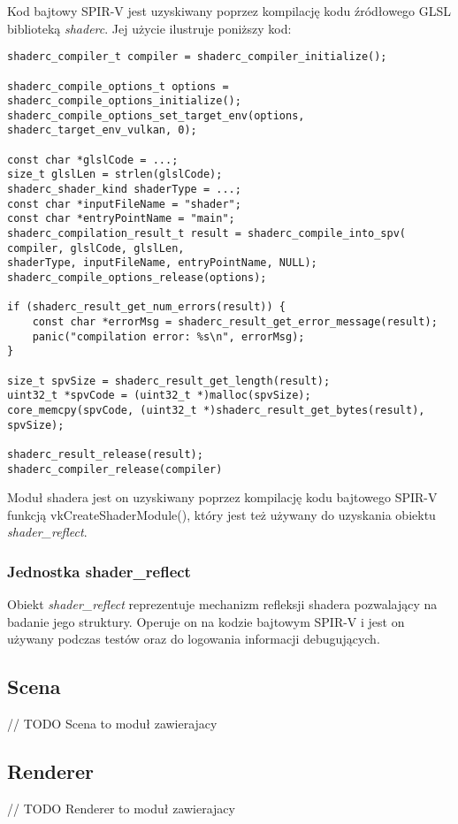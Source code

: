 Kod bajtowy SPIR-V jest uzyskiwany poprzez kompilację kodu źródłowego GLSL biblioteką \textit{shaderc}.
Jej użycie ilustruje poniższy kod:
\lstset{language=C}
\begin{lstlisting}
shaderc_compiler_t compiler = shaderc_compiler_initialize();

shaderc_compile_options_t options = shaderc_compile_options_initialize();
shaderc_compile_options_set_target_env(options, shaderc_target_env_vulkan, 0);

const char *glslCode = ...;
size_t glslLen = strlen(glslCode);
shaderc_shader_kind shaderType = ...;
const char *inputFileName = "shader";
const char *entryPointName = "main";
shaderc_compilation_result_t result = shaderc_compile_into_spv(
compiler, glslCode, glslLen,
shaderType, inputFileName, entryPointName, NULL);
shaderc_compile_options_release(options);

if (shaderc_result_get_num_errors(result)) {
	const char *errorMsg = shaderc_result_get_error_message(result);
	panic("compilation error: %s\n", errorMsg);
}

size_t spvSize = shaderc_result_get_length(result);
uint32_t *spvCode = (uint32_t *)malloc(spvSize);
core_memcpy(spvCode, (uint32_t *)shaderc_result_get_bytes(result), spvSize);

shaderc_result_release(result);
shaderc_compiler_release(compiler)
\end{lstlisting}

Moduł shadera jest on uzyskiwany poprzez kompilację kodu bajtowego SPIR-V funkcją vkCreateShaderModule(), który jest też używany do uzyskania obiektu \textit{shader\_reflect}.

\subsubsection{Jednostka shader\_reflect}
Obiekt \textit{shader\_reflect} reprezentuje mechanizm refleksji shadera pozwalający na badanie jego struktury.
Operuje on na kodzie bajtowym SPIR-V i jest on używany podczas testów oraz do logowania informacji debugujących.

\subsection{Scena}

// TODO Scena to moduł zawierajacy 

\subsection{Renderer}

// TODO Renderer to moduł zawierajacy 

